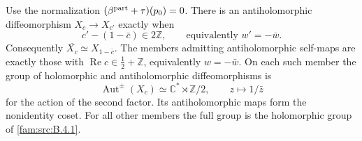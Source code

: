 \begin{proposition}\label{fam:src:B.4.2}\label{fam:st:B.4.2}
Use the normalization $(\beta^{\rm part}+\tau)(p_0)=0$. There is an antiholomorphic diffeomorphism $X_c\to X_{c'}$ exactly when
\[
 c'-(1-\bar c)\in2\mathbb Z,
 \qquad\text{equivalently }w'=-\bar w.
\]
Consequently $\overline{X_c}\simeq X_{1-\bar c}$. The members admitting antiholomorphic self-maps are exactly those with $\operatorname{Re}c\in\tfrac12+\mathbb Z$, equivalently $w=-\bar w$. On each such member the group of holomorphic and antiholomorphic diffeomorphisms is
\[
 \operatorname{Aut}^{\pm}(X_c)\simeq\mathbb C^*\rtimes\mathbb Z/2,
 \qquad z\longmapsto1/\bar z
\]
for the action of the second factor. Its antiholomorphic maps form the nonidentity coset. For all other members the full group is the holomorphic group of \ref{fam:src:B.4.1}.
\end{proposition}

